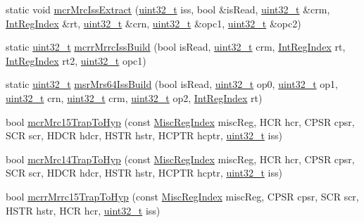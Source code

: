 \begin{DoxyCompactItemize}
\item 
static void \hyperlink{namespaceArmISA_a77aa2bfbf7d8b7a89dce050b9d3c164a}{mcrMrcIssExtract} (\hyperlink{Type_8hh_a435d1572bf3f880d55459d9805097f62}{uint32\_\-t} iss, bool \&isRead, \hyperlink{Type_8hh_a435d1572bf3f880d55459d9805097f62}{uint32\_\-t} \&crm, \hyperlink{namespaceArmISA_ae64680ba9fb526106829d6bf92fc791b}{IntRegIndex} \&rt, \hyperlink{Type_8hh_a435d1572bf3f880d55459d9805097f62}{uint32\_\-t} \&crn, \hyperlink{Type_8hh_a435d1572bf3f880d55459d9805097f62}{uint32\_\-t} \&opc1, \hyperlink{Type_8hh_a435d1572bf3f880d55459d9805097f62}{uint32\_\-t} \&opc2)
\item 
static \hyperlink{Type_8hh_a435d1572bf3f880d55459d9805097f62}{uint32\_\-t} \hyperlink{namespaceArmISA_afcdb894a2fb8b250bdb65111b6475c1e}{mcrrMrrcIssBuild} (bool isRead, \hyperlink{Type_8hh_a435d1572bf3f880d55459d9805097f62}{uint32\_\-t} crm, \hyperlink{namespaceArmISA_ae64680ba9fb526106829d6bf92fc791b}{IntRegIndex} rt, \hyperlink{namespaceArmISA_ae64680ba9fb526106829d6bf92fc791b}{IntRegIndex} rt2, \hyperlink{Type_8hh_a435d1572bf3f880d55459d9805097f62}{uint32\_\-t} opc1)
\item 
static \hyperlink{Type_8hh_a435d1572bf3f880d55459d9805097f62}{uint32\_\-t} \hyperlink{namespaceArmISA_aa7fe8a12c57d83bfdf8f226a670f24e3}{msrMrs64IssBuild} (bool isRead, \hyperlink{Type_8hh_a435d1572bf3f880d55459d9805097f62}{uint32\_\-t} op0, \hyperlink{Type_8hh_a435d1572bf3f880d55459d9805097f62}{uint32\_\-t} op1, \hyperlink{Type_8hh_a435d1572bf3f880d55459d9805097f62}{uint32\_\-t} crn, \hyperlink{Type_8hh_a435d1572bf3f880d55459d9805097f62}{uint32\_\-t} crm, \hyperlink{Type_8hh_a435d1572bf3f880d55459d9805097f62}{uint32\_\-t} op2, \hyperlink{namespaceArmISA_ae64680ba9fb526106829d6bf92fc791b}{IntRegIndex} rt)
\item 
bool \hyperlink{namespaceArmISA_a933631a49ec06206507756bf90af6c45}{mcrMrc15TrapToHyp} (const \hyperlink{namespaceArmISA_a1e522017e015d4c7efd6b2360143aa67}{MiscRegIndex} miscReg, HCR hcr, CPSR cpsr, SCR scr, HDCR hdcr, HSTR hstr, HCPTR hcptr, \hyperlink{Type_8hh_a435d1572bf3f880d55459d9805097f62}{uint32\_\-t} iss)
\item 
bool \hyperlink{namespaceArmISA_a7a449dbe63a2b802f5762633aae6b8f7}{mcrMrc14TrapToHyp} (const \hyperlink{namespaceArmISA_a1e522017e015d4c7efd6b2360143aa67}{MiscRegIndex} miscReg, HCR hcr, CPSR cpsr, SCR scr, HDCR hdcr, HSTR hstr, HCPTR hcptr, \hyperlink{Type_8hh_a435d1572bf3f880d55459d9805097f62}{uint32\_\-t} iss)
\item 
bool \hyperlink{namespaceArmISA_a94234bdfc81733dc351189308d10c9c9}{mcrrMrrc15TrapToHyp} (const \hyperlink{namespaceArmISA_a1e522017e015d4c7efd6b2360143aa67}{MiscRegIndex} miscReg, CPSR cpsr, SCR scr, HSTR hstr, HCR hcr, \hyperlink{Type_8hh_a435d1572bf3f880d55459d9805097f62}{uint32\_\-t} iss)

\end{DoxyCompactItemize}

